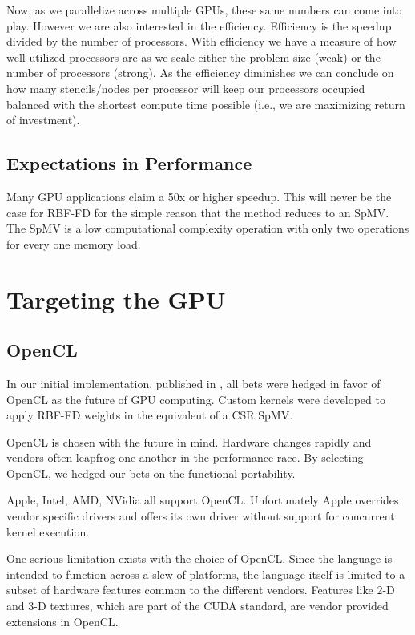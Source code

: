 \documentclass{report}
\begin{document}
Now, as we parallelize across multiple GPUs, these same numbers can come into
play. However we are also interested in the efficiency. Efficiency is the
speedup divided by the number of processors. With efficiency we have a measure
of how well-utilized processors are as we scale either the problem size (weak)
or the number of processors (strong). As the efficiency diminishes we can
conclude on how many stencils/nodes per processor will keep our processors
occupied balanced with the shortest compute time possible (i.e., we are
maximizing return of investment). 

\subsection{Expectations in Performance}
Many GPU applications claim a 50x or higher speedup. This will never be the case for RBF-FD for the simple reason that the method reduces to an SpMV. The SpMV is a low computational complexity operation with only two operations for every one memory load. 



\section{Targeting the GPU}

\subsection{OpenCL}
In our initial implementation, published in \cite{BolligFlyerErlebacher2012}, all bets were hedged in favor of OpenCL as the future of GPU computing. Custom kernels were developed to apply RBF-FD weights in the equivalent of a CSR SpMV. 

OpenCL is chosen with the future in mind. Hardware changes rapidly and vendors often leapfrog one another in the performance race. By selecting OpenCL, we hedged our bets on the functional portability. 

Apple, Intel, AMD, NVidia all support OpenCL.  Unfortunately Apple overrides vendor specific drivers and offers its own driver without support for concurrent kernel execution. 

One serious limitation exists with the choice of OpenCL. Since the language is intended to function across a slew of platforms, the language itself is limited to a subset of hardware features common to the different vendors. Features like 2-D and 3-D textures, which are part of the CUDA standard, are vendor provided extensions in OpenCL. 
\end{document}
